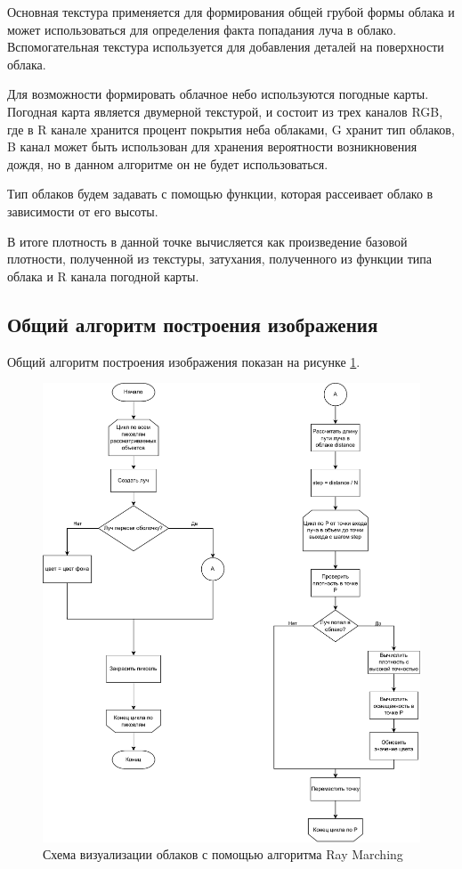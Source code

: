 Основная текстура применяется для формирования общей грубой формы облака и может использоваться для определения факта попадания луча в облако. Вспомогательная текстура используется для добавления деталей на поверхности облака.

Для возможности формировать облачное небо используются погодные карты. Погодная карта является двумерной текстурой, и состоит из трех каналов RGB, где в R канале хранится процент покрытия неба облаками, G хранит тип облаков, B канал может быть использован для хранения вероятности возникновения дождя, но в данном алгоритме он не будет использоваться. 

Тип облаков будем задавать с помощью функции, которая рассеивает облако в зависимости от его высоты. 

В итоге плотность в данной точке вычисляется как произведение базовой плотности, полученной из текстуры, затухания, полученного из функции типа облака и R канала погодной карты. 

\subsection{Общий алгоритм построения изображения}

Общий алгоритм построения изображения показан на рисунке \ref{fig:renderscheme}.

\begin{figure}
	\centering
	\includegraphics[width=1\textwidth]{assets/img/renderscheme.pdf} %
	\caption{Схема визуализации облаков с помощью алгоритма Ray Marching}
	\label{fig:renderscheme}
\end{figure}


